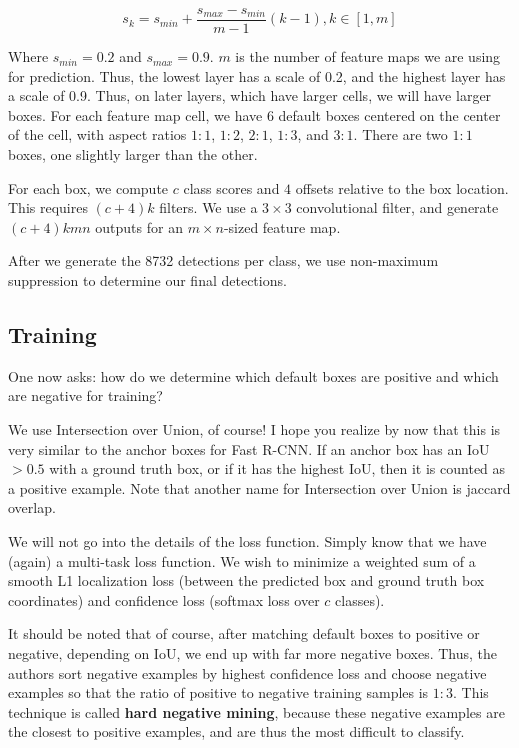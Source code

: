 \documentclass{article}
\begin{document}
\[s_k = s_{min} + \frac{s_{max} - s_{min}}{m-1}(k-1), k \in [1,m]\]

Where $s_{min}=0.2$ and $s_{max}=0.9$. $m$ is the number of feature maps we are using for prediction. Thus, the lowest layer has a scale of 0.2, and the highest layer has a scale of 0.9. Thus, on later layers, which have larger cells, we will have larger boxes. For each feature map cell, we have 6 default boxes centered on the center of the cell, with aspect ratios $1:1$, $1:2$, $2:1$, $1:3$, and $3:1$. There are two $1:1$ boxes, one slightly larger than the other.

For each box, we compute $c$ class scores and $4$ offsets relative to the box location. This requires $(c+4)k$ filters. We use a $3\times3$ convolutional filter, and generate $(c+4)kmn$ outputs for an $m\times n$-sized feature map.

After we generate the 8732 detections per class, we use non-maximum suppression to determine our final detections.

\subsection{Training}
One now asks: how do we determine which default boxes are positive and which are negative for training?

We use Intersection over Union, of course! I hope you realize by now that this is very similar to the anchor boxes for Fast R-CNN. If an anchor box has an IoU $> 0.5$ with a ground truth box, or if it has the highest IoU, then it is counted as a positive example. Note that another name for Intersection over Union is jaccard overlap.

We will not go into the details of the loss function. Simply know that we have (again) a multi-task loss function. We wish to minimize a weighted sum of a smooth L1 localization loss (between the predicted box and ground truth box coordinates) and confidence loss (softmax loss over $c$ classes).

It should be noted that of course, after matching default boxes to positive or negative, depending on IoU, we end up with far more negative boxes. Thus, the authors sort negative examples by highest confidence loss and choose negative examples so that the ratio of positive to negative training samples is $1:3$. This technique is called \textbf{hard negative mining}, because these negative examples are the closest to positive examples, and are thus the most difficult to classify.
\end{document}
